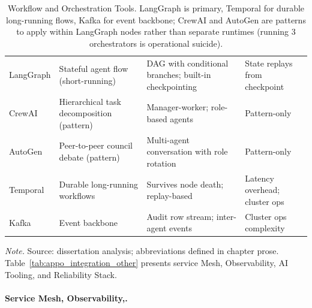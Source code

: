 {\tablestripes\tablefontsize
{}
\begin{xltabular}{\textwidth}{@{} >{\raggedright\arraybackslash}p{2.5cm} L L L @{}}
\caption[Workflow and Orchestration Tools]{Workflow and Orchestration Tools. LangGraph is primary, Temporal for durable long-running flows, Kafka for event backbone; CrewAI and AutoGen are patterns to apply within LangGraph nodes rather than separate runtimes (running 3 orchestrators is operational suicide).}\label{tab:appo_integration_workflow} \\
\toprule
{} &  &  &  \\
\midrule
\endfirsthead
\endhead
\bottomrule
\endlastfoot
LangGraph & Stateful agent flow (short-running) & DAG with conditional branches; built-in checkpointing & State replays from checkpoint \\
CrewAI & Hierarchical task decomposition (pattern) & Manager-worker; role-based agents & Pattern-only \\
AutoGen & Peer-to-peer council debate (pattern) & Multi-agent conversation with role rotation & Pattern-only \\
Temporal & Durable long-running workflows & Survives node death; replay-based & Latency overhead; cluster ops \\
Kafka & Event backbone & Audit row stream; inter-agent events & Cluster ops complexity \\
\end{xltabular}}
\vspace{0.3em}\noindent\textit{Note.} Source: dissertation analysis; abbreviations defined in chapter prose.
\noindent Table~\ref{tab:appo_integration_other} presents service Mesh, Observability, AI Tooling, and Reliability Stack.

\paragraph{Service Mesh, Observability,.}




